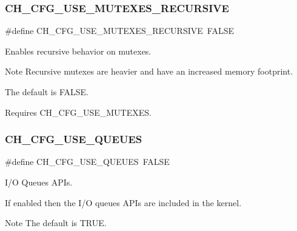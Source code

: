 \subsubsection{\texorpdfstring{C\+H\+\_\+\+C\+F\+G\+\_\+\+U\+S\+E\+\_\+\+M\+U\+T\+E\+X\+E\+S\+\_\+\+R\+E\+C\+U\+R\+S\+I\+VE}{CH\_CFG\_USE\_MUTEXES\_RECURSIVE}}
{\footnotesize\ttfamily \#define C\+H\+\_\+\+C\+F\+G\+\_\+\+U\+S\+E\+\_\+\+M\+U\+T\+E\+X\+E\+S\+\_\+\+R\+E\+C\+U\+R\+S\+I\+VE~F\+A\+L\+SE}



Enables recursive behavior on mutexes. 

\begin{DoxyNote}{Note}
Recursive mutexes are heavier and have an increased memory footprint.

The default is {\ttfamily F\+A\+L\+SE}. 

Requires {\ttfamily C\+H\+\_\+\+C\+F\+G\+\_\+\+U\+S\+E\+\_\+\+M\+U\+T\+E\+X\+ES}. 
\end{DoxyNote}
\hypertarget{group__config_ga9bb08f7384ee7ec4893bb28723286ee3}{}\label{group__config_ga9bb08f7384ee7ec4893bb28723286ee3} 
\subsubsection{\texorpdfstring{C\+H\+\_\+\+C\+F\+G\+\_\+\+U\+S\+E\+\_\+\+Q\+U\+E\+U\+ES}{CH\_CFG\_USE\_QUEUES}}
{\footnotesize\ttfamily \#define C\+H\+\_\+\+C\+F\+G\+\_\+\+U\+S\+E\+\_\+\+Q\+U\+E\+U\+ES~F\+A\+L\+SE}



I/O Queues A\+P\+Is. 

If enabled then the I/O queues A\+P\+Is are included in the kernel.

\begin{DoxyNote}{Note}
The default is {\ttfamily T\+R\+UE}. 
\end{DoxyNote}
\hypertarget{group__config_gaefe648290026609c1a1ee2d687ff60c1}{}\label{group__config_gaefe648290026609c1a1ee2d687ff60c1} 
